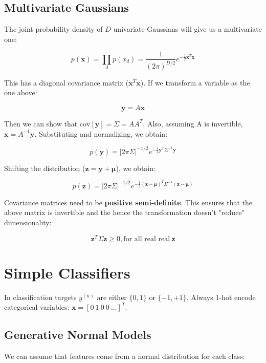 \documentclass{article}
\newcommand{\vf}[1]{\mathbf{#1}}
\begin{document}
\subsection{Multivariate Gaussians}
The joint probability density of $D$ univariate Gaussians will give us a multivariate one:

\begin{equation}
    p(\vf{x}) = \prod_d p(x_d) = \frac{1}{(2\pi)^{D/2}} e^{-\frac{1}{2} \vf{x}^T \vf{x}}
\end{equation}

This has a diagonal covariance matrix ($\vf{x}^T \vf{x}$). If we transform a variable as the one above:

\begin{equation}
    \vf{y} = A \vf{x}
\end{equation}

Then we can show that $\text{cov}[\vf{y}] = \Sigma = AA^T$. Also, assuming A is invertible, $\vf{x} = A^{-1} \vf{y}$. Substituting and normalizing, we obtain:

\begin{equation}
    p(\vf{y}) = {|2\pi\Sigma}|^{-1/2} e^{-\frac{1}{2} \vf{y}^T \Sigma^{-1} \vf{y}}
\end{equation}

Shifting the distribution ($\vf{z} = \vf{y} + \vf{\mu}$), we obtain:

\begin{equation}
    p(\vf{z}) = {|2\pi\Sigma}|^{-1/2} e^{-\frac{1}{2} (\vf{z} - \vf{\mu})^T \Sigma^{-1} (\vf{z} - \vf{\mu})}
\end{equation}

Covariance matrices need to be \textbf{positive semi-definite}. This ensures that the above matrix is invertible and the hence the transformation doesn't "reduce" dimensionality:

\begin{equation}
    \vf{z}^T \Sigma \vf{z} \geq 0, \text{for all real real}\ \vf{z} 
\end{equation}

\section{Simple Classifiers}
In classification targets $y^{(n)}$ are either $\{0, 1\}$ or $\{-1, +1\}$. Always 1-hot encode categorical variables: $\vf{x} = [0\ 1\ 0\ 0\ \dots]^T$. 

\subsection{Generative Normal Models}
We can assume that features come from a normal distribution for each class:
\end{document}
